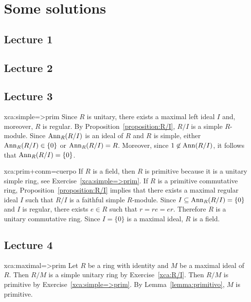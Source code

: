 \chapter{Some solutions}

\section*{Lecture 1}
\section*{Lecture 2}
\section*{Lecture 3}

\begin{sol}{xca:simple=>prim}
	Since $R$ is unitary, there exists a maximal left ideal $I$ and, moreover, $R$ is regular.
	By Proposition~\ref{proposition:R/I}, $R/I$ is a simple $R$-module. 
	Since $\operatorname{Ann}_R(R/I)$ is an ideal of $R$ and $R$ is simple, either $\operatorname{Ann}_R(R/I)\in\{0\}$ or 
	$\operatorname{Ann}_R(R/I)=R$. Moreover, since 
	$1\not\in\operatorname{Ann}(R/I)$, it follows that 
	$\operatorname{Ann}_R(R/I)=\{0\}$. 
\end{sol}

\begin{sol}{xca:prim+conm=cuerpo}
	If $R$ is a field, then $R$ is primitive because it is a unitary simple ring, see  
	Exercise~\ref{xca:simple=>prim}. If $R$ is a primitive commutative ring, Proposition~\ref{proposition:R/I} implies that there exists a maximal regular ideal $I$
	such that  
	$R/I$ is a faithful simple $R$-module. 
	Since $I\subseteq \operatorname{Ann}_R(R/I)=\{0\}$ and $I$ is regular, there exists $e\in R$ such that 
	$r=re=er$. Therefore $R$ is a unitary commutative ring. Since $I=\{0\}$ is a maximal ideal, 
	$R$ is a field. 
\end{sol}

\section*{Lecture 4}

\begin{sol}{xca:maximal=>prim}
	Let $R$ be a ring with identity and $M$ be a maximal ideal of $R$. Then 
	$R/M$ is a simple unitary ring by 
	Exercise~\ref{xca:R/I}. Then $R/M$ is primitive by
	Exercise~\ref{xca:simple=>prim}. By Lemma~\ref{lemma:primitivo}, 
	$M$ is primitive. 
\end{sol}

